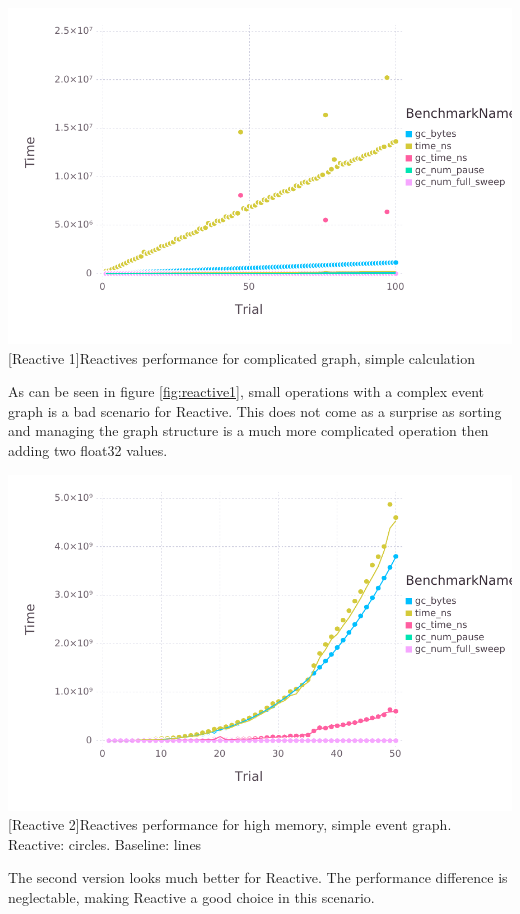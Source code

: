\begin{minipage}{\linewidth}
    \centering
    \includegraphics[width=0.9\linewidth]{graphics/react_bench2.pdf}
    [Reactive 1]{Reactives performance for complicated graph, simple calculation}
    \label{fig:reactive1}
\end{minipage}
As can be seen in figure \ref{fig:reactive1}, small operations with a complex event graph is a bad scenario for Reactive.
This does not come as a surprise as sorting and managing the graph structure is a much more complicated operation then adding two float32 values.

\vspace{1em}
\begin{minipage}{\linewidth}
    \centering
    \includegraphics[width=0.9\linewidth]{graphics/react_bench.pdf}
    [Reactive 2]{Reactives performance for high memory, simple event graph. Reactive: circles. Baseline: lines}
    \label{fig:reactive2}
\end{minipage}
\vspace{1em}
The second version looks much better for Reactive. The performance difference is neglectable, making Reactive a good choice in this scenario.


